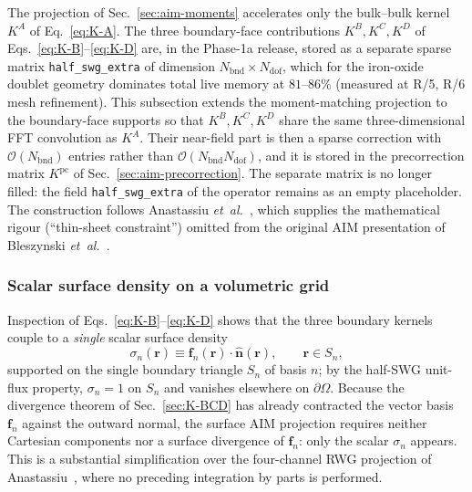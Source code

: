 \documentclass[11pt,a4paper]{article}
\begin{document}
The projection of Sec.~\ref{sec:aim-moments} accelerates only the
bulk--bulk kernel $K^{A}$ of Eq.~\eqref{eq:K-A}. The three boundary-face
contributions $K^{B}, K^{C}, K^{D}$ of Eqs.~\eqref{eq:K-B}--\eqref{eq:K-D}
are, in the Phase-1a release, stored as a separate sparse matrix
\texttt{half\_swg\_extra} of dimension $N_{\text{bnd}} \times
N_{\text{dof}}$, which for the iron-oxide doublet geometry dominates
total live memory at $81$--$86\%$ (measured at R/5, R/6 mesh
refinement). This subsection extends the moment-matching projection to
the boundary-face supports so that $K^{B}, K^{C}, K^{D}$ share the same
three-dimensional FFT convolution as $K^{A}$. Their near-field part is
then a sparse correction with $\mathcal{O}(N_{\text{bnd}})$ entries
rather than $\mathcal{O}(N_{\text{bnd}} N_{\text{dof}})$, and it is
stored in the precorrection matrix $K^{\text{pc}}$ of
Sec.~\ref{sec:aim-precorrection}. The separate matrix is no longer
filled: the field \texttt{half\_swg\_extra} of the operator remains as
an empty placeholder. The construction follows
Anastassiu \emph{et~al.}~\cite{Anastassiu1998}, which supplies the
mathematical rigour (``thin-sheet constraint'') omitted from the
original AIM presentation of Bleszynski \emph{et~al.}~\cite{Bleszynski1996}.

\subsubsection*{Scalar surface density on a volumetric grid}

Inspection of Eqs.~\eqref{eq:K-B}--\eqref{eq:K-D} shows that the three
boundary kernels couple to a \emph{single} scalar surface density
\begin{equation}
  \sigma_n(\bm{r}) \equiv \bm{f}_n(\bm{r})\!\cdot\!\hat{\bm{n}}(\bm{r}),
  \qquad \bm{r}\in S_n,
  \label{eq:surf-density}
\end{equation}
supported on the single boundary triangle $S_n$ of basis $n$; by the
half-SWG unit-flux property, $\sigma_n = 1$ on $S_n$ and vanishes
elsewhere on $\partial\Omega$. Because the divergence theorem of
Sec.~\ref{sec:K-BCD} has already contracted the vector basis
$\bm{f}_n$ against the outward normal, the surface AIM projection
requires neither Cartesian components nor a surface divergence of
$\bm{f}_n$: only the scalar $\sigma_n$ appears. This is a substantial
simplification over the four-channel RWG projection of
Anastassiu~\cite{Anastassiu1998}, where no preceding integration by
parts is performed.
\end{document}
